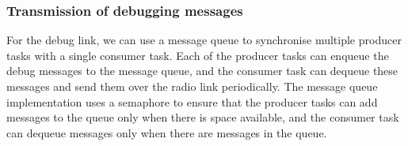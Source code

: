 \subsubsection*{Transmission of debugging messages}

For the debug link, we can use a message queue to synchronise multiple producer tasks with a single consumer task.
Each of the producer tasks can enqueue the debug messages to the message queue, and the consumer task can dequeue these messages and send them over the radio link periodically.
The message queue implementation uses a semaphore to ensure that the producer tasks can add messages to the queue only when there is space available, and the consumer task can dequeue messages only when there are messages in the queue.
